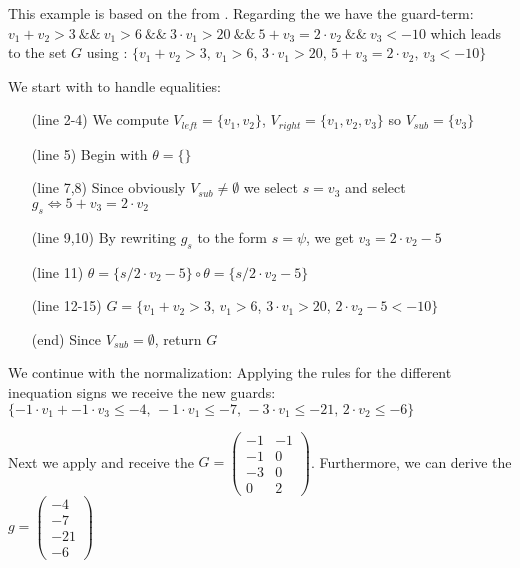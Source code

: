\begin{example}
	\label{ex:derivation-guard}
	This example is based on the \its  from .
	Regarding the \its we have the guard-term:\newline
	\hspace*{2cm}$v_1 + v_2 > 3 \>\&\&\> v_1 > 6 \>\&\&\> 3 \cdot v_1 > 20 \>\&\&\> 5 + v_3 = 2 \cdot v_2 \>\&\&\> v_3 < -10$\newline
	which leads to the set $G$ using :\newline
	\hspace*{2cm}$\{v_1 + v_2 > 3\text{, } v_1 > 6 \text{, } 3 \cdot v_1 > 20 \text{, } 5 + v_3 = 2 \cdot v_2 \text{, } v_3 < -10\}$\newline	
	
	We start with  to handle equalities:
	\begin{enumerate}
		\setlength{\itemindent}{1in}
		\item[(line 2-4)] We compute $V_{left}=\{v_1, v_2\}$, $V_{right}=\{v_1,v_2,v_3\}$ so $V_{sub}=\{v_3\}$
		\item[(line 5)] Begin with $\theta=\{\}$ 
		\item[(line 7,8)] Since obviously $V_{sub} \neq \emptyset$  we select $s=v_3$ and select $g_s \Leftrightarrow 5+v_3=2\cdot v_2$
		\item[(line 9,10)] By rewriting $g_s$ to the form $s=\psi$, we get $v_3=2\cdot v_2-5$
		\item[(line 11)] $\theta = \{s/2\cdot v_2-5\} \circ \theta = \{s/2\cdot v_2-5\}$
		\item[(line 12-15)] $G=\{v_1 + v_2 > 3$, $ v_1 > 6 $, $ 3 \cdot  v_1 > 20 $, $ 2\cdot v_2-5 < -10\}$
		\item[(end)] Since $V_{sub}=\emptyset$, return $G$
	\end{enumerate}
	
	We continue with the normalization:\newline
	Applying the rules for the different inequation signs we receive the new guards:\newline
	\hspace*{1cm}$\{-1\cdot v_1+-1\cdot v_3 \le -4\text{, } -1\cdot v_1 \le -7 \text{, } -3\cdot v_1 \le -21\text{, } 2\cdot v_2\le -6\}$\newline
	
	Next we apply  and receive the \guardmatrix  $G = \begin{pmatrix} -1 & -1 \\ -1 & 0 \\ -3 & 0 \\ 0 & 2 \end{pmatrix}$. Furthermore, we can derive the \guardconstants $g= \begin{pmatrix} -4 \\ -7 \\ -21 \\ -6 \end{pmatrix}$
\end{example}

